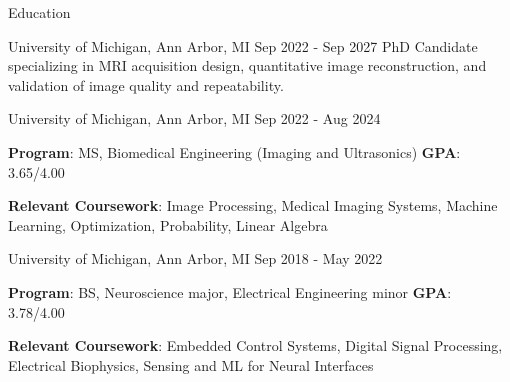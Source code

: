 \documentclass{resume}
\begin{document}
\begin{rSection}{Education}
\begin{rSubsection}{University of Michigan}{, Ann Arbor, MI \hfill {Sep 2022 - Sep 2027}}
	PhD Candidate specializing in MRI acquisition design, quantitative image reconstruction, and validation of image quality and repeatability.
\end{rSubsection}
\begin{rSubsection}{University of Michigan}{, Ann Arbor, MI \hfill {Sep 2022 - Aug 2024}}
	\item \textbf{Program}: MS, Biomedical Engineering (Imaging and Ultrasonics) \hfill{\textbf{GPA}: 3.65/4.00}
    \item{\textbf{Relevant Coursework}: Image Processing, Medical Imaging Systems, Machine Learning, Optimization, Probability, Linear Algebra}
\end{rSubsection}
\begin{rSubsection}{University of Michigan}{, Ann Arbor, MI \hfill {Sep 2018 - May 2022}}
	\item{\textbf{Program}: BS, Neuroscience major, Electrical Engineering minor} \hfill{\textbf{GPA}: 3.78/4.00}
    \item{\textbf{Relevant Coursework}: Embedded Control Systems, Digital Signal Processing, Electrical Biophysics, Sensing and ML for Neural Interfaces}
\end{rSubsection}
\end{rSection}
\end{document}
